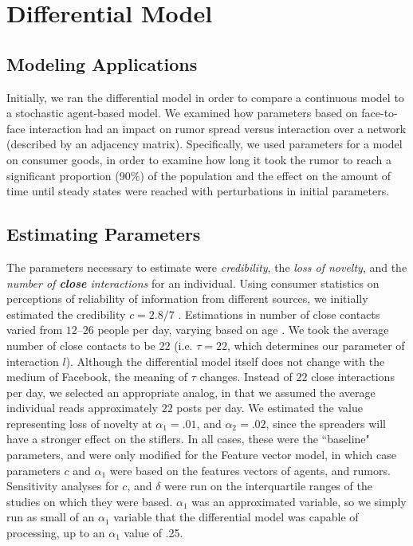 \section{Differential Model }
\label{sec:diffmodel}

\subsection{Modeling Applications}
\label{subsec:diffmodeapp}

Initially, we ran the differential model in order to compare a continuous model to a stochastic agent-based model. We examined how parameters based on face-to-face interaction had an impact on rumor spread versus interaction over a network (described by an adjacency matrix). Specifically, we used parameters for a model on consumer goods, in order to examine how long it took the rumor to reach a significant proportion (90\%) of the population and the effect on the amount of time until steady states were reached with perturbations in initial parameters.

\subsection{Estimating Parameters}
\label{subsec:diffmodeeparam}

The parameters necessary to estimate were \textit{credibility}, the 
\textit{loss of novelty}, and the \textit{number of \textbf{close} interactions} for an individual. Using consumer statistics on perceptions of reliability of information from different sources, we initially estimated the credibility $ c = 2.8/7 $ \cite{kamins-1997}. Estimations in number of close contacts varied from $ 12 $--$ 26 $ people per day, varying based on age \cite{cahill-1996, mossong-2008, edmunds-2006}. We took the average number of close contacts to be $ 22 $ (i.e. $ \tau = 22 $, which determines our parameter of interaction $ l $). Although the differential model itself does not change with the medium of Facebook, the meaning of $ \tau $ changes. Instead of $ 22 $ close interactions per day, we selected an appropriate analog, in that we assumed the average individual reads approximately $ 22 $ posts per day. We estimated the value representing loss of novelty at $ \alpha_1 = .01 $, and  $ \alpha_2 = .02 $, since the spreaders will have a stronger effect on the stiflers. 
In all cases, these were the ``baseline" parameters, and were only modified for the Feature vector model, in which case parameters $ c $ and $ \alpha_1 $  were based on the features vectors of agents, and rumors. Sensitivity analyses for $ c $, and $ \delta $ were run on the interquartile ranges of the studies on which they were based. $ \alpha_1 $ was an approximated variable, so we simply run as small of an $ \alpha_1 $ variable that the differential model was capable of processing, up to an $ \alpha_1 $ value of .25.